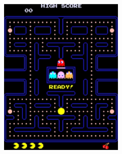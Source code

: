 \documentclass[12pt,a4paper]{report}
\begin{document}
\begin{figure}[hb!]
\begin{subfigure}{.32\textwidth}
  \centering
  \includegraphics[width=.95\linewidth]{snapshot1}
  \caption{}
  \label{fig:snap1}
\end{subfigure}%
\begin{subfigure}{.32\textwidth}
  \centering

\end{subfigure}
\end{figure}
\end{document}
